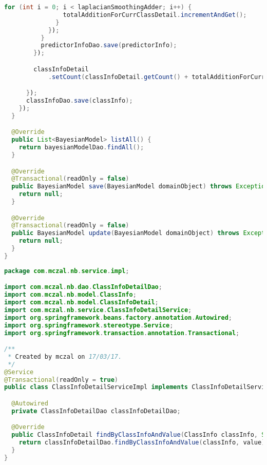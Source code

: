 \begin{lstlisting}[language=Java,basicstyle=\tiny,caption=BayesianModelService.java]
              for (int i = 0; i < laplacianSmoothingAdder; i++) {
                totalAdditionForCurrClassDetail.incrementAndGet();
              }
            });
          }
          predictorInfoDao.save(predictorInfo);
        });

        classInfoDetail
            .setCount(classInfoDetail.getCount() + totalAdditionForCurrClassDetail.get());

      });
      classInfoDao.save(classInfo);
    });
  }

  @Override
  public List<BayesianModel> listAll() {
    return bayesianModelDao.findAll();
  }

  @Override
  @Transactional(readOnly = false)
  public BayesianModel save(BayesianModel domainObject) throws Exception {
    return null;
  }

  @Override
  @Transactional(readOnly = false)
  public BayesianModel update(BayesianModel domainObject) throws Exception {
    return null;
  }
}

\end{lstlisting}


\begin{lstlisting}[language=Java,basicstyle=\tiny,caption=ClassInfoDetailServiceImpl.java]
package com.mczal.nb.service.impl;

import com.mczal.nb.dao.ClassInfoDetailDao;
import com.mczal.nb.model.ClassInfo;
import com.mczal.nb.model.ClassInfoDetail;
import com.mczal.nb.service.ClassInfoDetailService;
import org.springframework.beans.factory.annotation.Autowired;
import org.springframework.stereotype.Service;
import org.springframework.transaction.annotation.Transactional;

/**
 * Created by mczal on 17/03/17.
 */
@Service
@Transactional(readOnly = true)
public class ClassInfoDetailServiceImpl implements ClassInfoDetailService {

  @Autowired
  private ClassInfoDetailDao classInfoDetailDao;

  @Override
  public ClassInfoDetail findByClassInfoAndValue(ClassInfo classInfo, String value) {
    return classInfoDetailDao.findByClassInfoAndValue(classInfo, value);
  }
}

\end{lstlisting}


